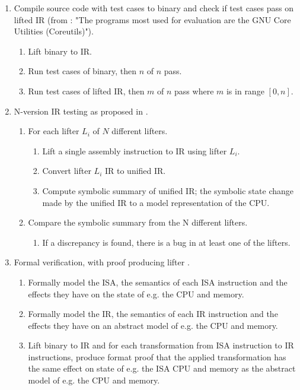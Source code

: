 \documentclass[12pt, a4paper]{article}
\begin{document}
\begin{enumerate}
	\item Compile source code with test cases to binary and check if test cases pass on lifted IR (from \cite{type_inference_on_executables}: "The programs most used for evaluation are the GNU Core Utilities (Coreutils)").
	\begin{enumerate}
		\item Lift binary to IR.
		\item Run test cases of binary, then $n$ of $n$ pass.
		\item Run test cases of lifted IR, then $m$ of $n$ pass where $m$ is in range $[0, n]$.
	\end{enumerate}
	\item N-version IR testing as proposed in \cite{evaluation_of_irs}.
	\begin{enumerate}
		\item For each lifter $L_i$ of $N$ different lifters.
		\begin{enumerate}
			\item Lift a single assembly instruction to IR using lifter $L_i$.
			\item Convert lifter $L_i$ IR to unified IR.
			\item Compute symbolic summary of unified IR; the symbolic state change made by the unified IR to a model representation of the CPU.
		\end{enumerate}
		\item Compare the symbolic summary from the N different lifters.
		\begin{enumerate}
			\item If a discrepancy is found, there is a bug in at least one of the lifters.
		\end{enumerate}
	\end{enumerate}
	\item Formal verification, with proof producing lifter \cite{sound_transpilation_from_binary_to_ir}.
	\begin{enumerate}
		\item Formally model the ISA, the semantics of each ISA instruction and the effects they have on the state of e.g. the CPU and memory.
		\item Formally model the IR, the semantics of each IR instruction and the effects they have on an abstract model of e.g. the CPU and memory.
		\item Lift binary to IR and for each transformation from ISA instruction to IR instructions, produce format proof that the applied transformation has the same effect on state of e.g. the ISA CPU and memory as the abstract model of e.g. the CPU and memory.
	\end{enumerate}
\end{enumerate}
\end{document}
